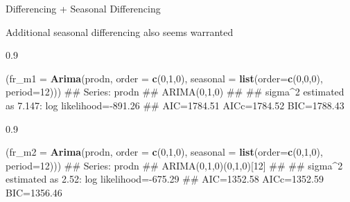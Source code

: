 \documentclass[11pt,ignorenonframetext,]{beamer}
\newenvironment{Shaded}{}{}
\newcommand{\KeywordTok}[1]{\textcolor[rgb]{0.00,0.44,0.13}{\textbf{#1}}}
\newcommand{\DataTypeTok}[1]{\textcolor[rgb]{0.56,0.13,0.00}{#1}}
\newcommand{\DecValTok}[1]{\textcolor[rgb]{0.25,0.63,0.44}{#1}}
\newcommand{\NormalTok}[1]{#1}
\let\oldShaded\Shaded
\let\endoldShaded\endShaded
\renewenvironment{Shaded}{\footnotesize\begin{spacing}{0.9}\oldShaded}{\endoldShaded\end{spacing}}
\begin{document}
\begin{frame}[fragile]{Differencing + Seasonal Differencing}

Additional seasonal differencing also seems warranted

\begin{Shaded}
\begin{Highlighting}[]
\NormalTok{(}\DataTypeTok{fr_m1 =} \KeywordTok{Arima}\NormalTok{(prodn, }\DataTypeTok{order =} \KeywordTok{c}\NormalTok{(}\DecValTok{0}\NormalTok{,}\DecValTok{1}\NormalTok{,}\DecValTok{0}\NormalTok{), }
            \DataTypeTok{seasonal =} \KeywordTok{list}\NormalTok{(}\DataTypeTok{order=}\KeywordTok{c}\NormalTok{(}\DecValTok{0}\NormalTok{,}\DecValTok{0}\NormalTok{,}\DecValTok{0}\NormalTok{), }\DataTypeTok{period=}\DecValTok{12}\NormalTok{)))}
\NormalTok{## Series: prodn }
\NormalTok{## ARIMA(0,1,0)                    }
\NormalTok{## }
\NormalTok{## sigma^2 estimated as 7.147:  log likelihood=-891.26}
\NormalTok{## AIC=1784.51   AICc=1784.52   BIC=1788.43}
\end{Highlighting}
\end{Shaded}

\begin{Shaded}
\begin{Highlighting}[]
\NormalTok{(}\DataTypeTok{fr_m2 =} \KeywordTok{Arima}\NormalTok{(prodn, }\DataTypeTok{order =} \KeywordTok{c}\NormalTok{(}\DecValTok{0}\NormalTok{,}\DecValTok{1}\NormalTok{,}\DecValTok{0}\NormalTok{), }
            \DataTypeTok{seasonal =} \KeywordTok{list}\NormalTok{(}\DataTypeTok{order=}\KeywordTok{c}\NormalTok{(}\DecValTok{0}\NormalTok{,}\DecValTok{1}\NormalTok{,}\DecValTok{0}\NormalTok{), }\DataTypeTok{period=}\DecValTok{12}\NormalTok{)))}
\NormalTok{## Series: prodn }
\NormalTok{## ARIMA(0,1,0)(0,1,0)[12]                    }
\NormalTok{## }
\NormalTok{## sigma^2 estimated as 2.52:  log likelihood=-675.29}
\NormalTok{## AIC=1352.58   AICc=1352.59   BIC=1356.46}
\end{Highlighting}
\end{Shaded}

\end{frame}
\end{document}
